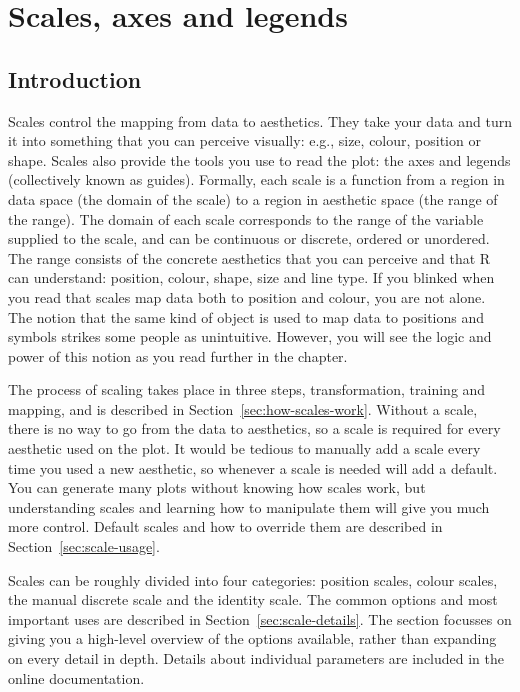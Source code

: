 
\chapter{Scales, axes and legends}
\label{cha:scales}

% 


\section{Introduction}

Scales control the mapping from data to aesthetics. They take your data and turn it into something that you can perceive visually: e.g., size, colour, position or shape. Scales also provide the tools you use to read the plot: the axes and legends (collectively known as guides). Formally, each scale is a function from a region in data space (the domain of the scale) to a region in aesthetic space (the range of the range). The domain of each scale corresponds to the range of the variable supplied to the scale, and can be continuous or discrete, ordered or unordered. The range consists of the concrete aesthetics that you can perceive and that R can understand: position, colour, shape, size and line type. If you blinked when you read that scales map data both to position and colour, you are not alone. The notion that the same kind of object is used to map data to positions and symbols strikes some people as unintuitive. However, you will see the logic and power of this notion as you read further in the chapter.

The process of scaling takes place in three steps, transformation, training and mapping, and is described in Section~\ref{sec:how-scales-work}. Without a scale, there is no way to go from the data to aesthetics, so a scale is required for every aesthetic used on the plot. It would be tedious to manually add a scale every time you used a new aesthetic, so whenever a scale is needed \ggplot will add a default. You can generate many plots without knowing how scales work, but understanding scales and learning how to manipulate them will give you much more control. Default scales and how to override them are described in Section~\ref{sec:scale-usage}. 

Scales can be roughly divided into four categories: position scales, colour scales, the manual discrete scale and the identity scale. The common options and most important uses are described in Section~\ref{sec:scale-details}. The section focusses on giving you a high-level overview of the options available, rather than expanding on every detail in depth.  Details about individual parameters are included in the online documentation.

